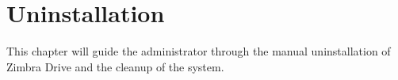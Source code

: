 \chapter{Uninstallation}\label{==cha:uninstallation==}
This chapter will guide the administrator through the manual uninstallation of Zimbra Drive and
the cleanup of the system.



